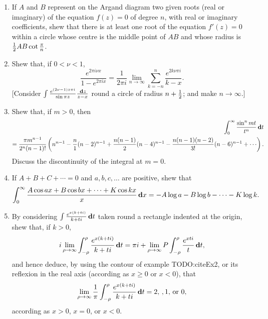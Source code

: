 \begin{enumerate}
\item
  If $A$ and $B$ represent on the Argand diagram two given roots (real
  or imaginary) of the equation $f(z) = 0$ of degree $n$, with real or
  imaginary coefficients, shew that there is at least one root of the
  equation $f'(z) = 0$ within a circle whose centre is the middle point
  of $AB$ and whose radius is $\frac{1}{2} AB \cot \frac{\pi}{n}$.
\item
  Shew that, if $0<\nu<1$,
  $$
  \frac{e^{2\pi i \nu x}}{1 - e^{2\pi i x}}
  =
  \frac{1}{2\pi i}
  \lim_{n\rightarrow\infty}
  \sum_{k=-n}^{n} \frac{e^{2k\nu\pi i}}{k-x}.
  $$
  [Consider
  $
  \int \frac{e^{(2\nu-1) z \pi i}}{\sin \pi z}
  \frac{\, \mathbf{d} z}{z-x}
  $
  round a circle of radius $n+\frac{1}{2}$; and make $n\rightarrow\infty$.]
\item
  Shew that, if $m > 0$, then
  \begin{align*}
    \int_{0}^{\infty}
    \frac{\sin^{n} mt}{t^{n}} \dmeasure t
    \\
    =
    \frac{\pi m^{n-1}}{2^{n} (n-1)!}
    \theparen{
      n^{n-1}
      -
      \frac{n}{1} (n-2)^{n-1}
      +
      \frac{n(n-1)}{2} (n-4)^{n-1}
      -
      \frac{n(n-1)(n-2)}{3!} (n-6)^{n-1}
      +
      \cdots
    }.
  \end{align*}
  Discuss the discontinuity of the integral at $m = 0$.

\item
  If $A + B + C + \cdots = 0$ and $a, b, c, \ldots$ are positive, shew that
  $$
  \int_{0}^{\infty}
  \frac{A \cos ax + B \cos bx + \cdots + K \cos kx}{x}
  \, \mathbf{d} x
  =
  -A \log a
  -B \log b
  - \cdots
  -K \log k.
  $$
\item
  By considering
  $
  \int \frac{e^{x(k+ti)}}{k+ti} \, \mathbf{d} t
  $
  taken round a rectangle indented at the origin, shew
  that, if $k > 0$,
  $$
  i \lim_{\rho\rightarrow\infty}
  \int_{-\rho}^{\rho}
  \frac{e^{x(k+ti)}}{k+ti} \, \mathbf{d} t
  =
  \pi i
  +
  \lim_{\rho\rightarrow\infty}
  P \int_{-\rho}^{\rho} \frac{e^{xti}}{t} \, \mathbf{d} t,
  $$
  and hence deduce, by using the contour of
   example
  TODO:citeEx2, or its reflexion in the real axis
  (according as $x \geq 0$ or $x < 0$), that
  $$
  \lim_{\rho\rightarrow\infty}
  \frac{1}{\pi}
  \int_{-\rho}^{\rho}
  \frac{e^{x(k+ti)}}{k+ti} \, \mathbf{d} t
  =
  2,\, , 1,\, \textrm{or } 0,
  $$
  according as $x>0$, $x = 0$, or $x < 0$.


\end{enumerate}
